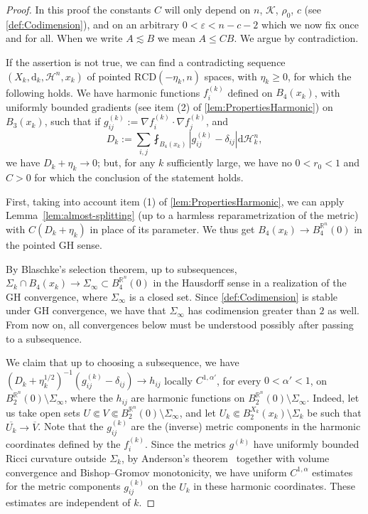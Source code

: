 \documentclass[12pt,a4paper,reqno]{amsart}
\renewcommand{\leq}{\leqslant}
\renewcommand{\geq}{\geqslant}
\renewcommand{\d}{\ensuremath{\mathrm d}}
\begin{document}
\begin{proof}
    In this proof the constants $C$ will only depend on $n$, $\mathcal{K}$, $\rho_0$, $c$ (see \cref{def:Codimension}), and on an arbitrary $0<\varepsilon<n-c-2$ which we now fix once and for all. When we write $A\lesssim B$ we mean $A\leq CB$. We argue by contradiction.
    
    If the assertion is not true, we can find a contradicting sequence $(X_k,\mathrm{d}_k,\mathcal{H}^n,x_k)$ of pointed $\mathrm{RCD}(-\eta_k,n)$ spaces, with $\eta_k\geq 0$, for which the following holds. We have harmonic functions $f^{(k)}_i$ defined on $B_4(x_k)$, with uniformly bounded gradients (see item (2) of \cref{lem:PropertiesHarmonic}) on $B_3(x_k)$, such that if $g^{(k)}_{ij} := \nabla f^{(k)}_i\cdot \nabla f^{(k)}_j$, and 
    \[ D_k := \sum_{i,j} \fint_{B_4(x_k)} |g_{ij}^{(k)} - \delta_{ij}|\d\mathcal{H}^n_k, \]
    we have $D_k+\eta_k\to 0$;
    but, for any $k$ sufficiently large, we have no $0<r_0<1$ and $C>0$ for which the conclusion of the statement holds.
    
    First, taking into account item (1) of \cref{lem:PropertiesHarmonic}, we can apply Lemma~\ref{lem:almost-splitting} (up to a harmless reparametrization of the metric)  with
$C(D_k+\eta_k)$ in place of its parameter.
    We thus get $B_4(x_k) \to B_4^{\mathbb R^n}(0)$ in the pointed GH sense.
    
    

    By Blaschke's selection theorem, up to subsequences, $\Sigma_k\cap B_4(x_k) \to \Sigma_\infty\subset B_4^{\mathbb R^n}(0)$ in the Hausdorff sense in a realization of the GH convergence, where $\Sigma_\infty$ is a closed set. Since \cref{def:Codimension} is stable under GH convergence, we have that $\Sigma_\infty$ has codimension greater than $2$ as well. From now on, all convergences below must be understood possibly after passing to a subsequence.
    
    We claim that up to choosing a subsequence, we have $(D_k+\eta_k^{1/2})^{-1}(g_{ij}^{(k)} - \delta_{ij}) \to h_{ij}$ locally $C^{1,\alpha'}$, for every $0<\alpha'<1$, on $B_2^{\mathbb R^n}(0)\setminus \Sigma_\infty$, where the $h_{ij}$ are harmonic functions on $B_2^{\mathbb R^n}(0)\setminus\Sigma_{\infty}$. Indeed, let us take open sets $U\Subset V\Subset B_2^{\mathbb R^n}(0)\setminus \Sigma_\infty$, and let $U_k\Subset B_2^{X_k}(x_k)\setminus \Sigma_k$ be such that $\overline{U_k}\to \overline{V}$. Note that the $g^{(k)}_{ij}$ are the (inverse) metric components in the harmonic coordinates defined by  the $f^{(k)}_i$. 
    Since the metrics $g^{(k)}$ have uniformly bounded Ricci curvature outside $\Sigma_k$, by Anderson's theorem~\cite{Anderson90} together with volume convergence and Bishop--Gromov monotonicity, we have uniform $C^{1,\alpha}$ estimates for the metric components $g^{(k)}_{ij}$ on the $U_k$ in these harmonic coordinates. These estimates are independent of $k$. 
    

\end{proof}
\end{document}
